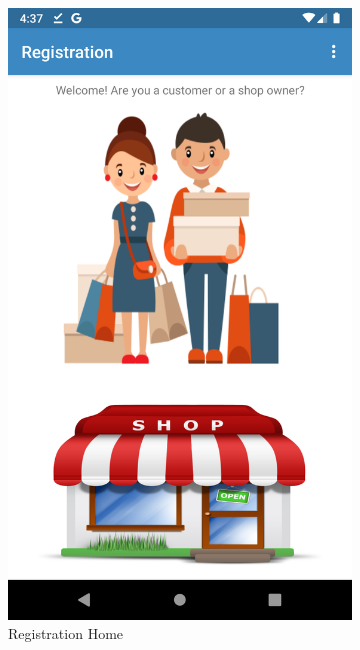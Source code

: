 \begin{figure}[h]
\centering
\begin{subfigure}{.5\textwidth}
  \centering
  \includegraphics[height=.4\textheight, keepaspectratio=true]{Img/Screens/Registration_Home}
  \caption{Registration Home}
\end{subfigure}%
\begin{subfigure}{.5\textwidth}
  \centering

\end{subfigure}
\end{figure}
